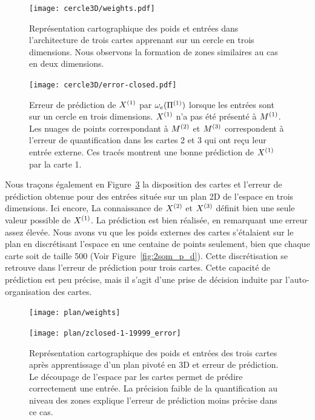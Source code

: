\documentclass[../main]{subfiles}
\begin{document}
\begin{figure}[h!]
	\centering\texttt{[image: cercle3D/weights.pdf]}
	\caption{Représentation cartographique des poids et entrées dans l'architecture de trois cartes apprenant sur un cercle en trois dimensions. Nous observons la formation de zones similaires au cas en deux dimensions. \label{fig:w_cercle}}
\end{figure}

\begin{figure}[h!]
	\texttt{[image: cercle3D/error-closed.pdf]}
	\caption{Erreur de prédiction de $X^{({1})}$ par $\omega_e(\Pi^{({1})})$ lorsque les entrées sont sur un cercle en trois dimensions. $X^{({1})}$ n'a pas été présenté à $M^{({1})}$.
	 Les nuages de points correspondant à $M^{({2})}$ et $M^{({3})}$ correspondent à l'erreur de quantification dans les cartes 2 et 3 qui ont reçu leur entrée externe. Ces tracés montrent une bonne prédiction de $X^{({1})}$ par la carte 1. \label{fig:pred_cercle}}
\end{figure}


Nous traçons également en Figure~\ref{fig:plan3} la disposition des cartes et l'erreur de prédiction obtenue pour des entrées située sur un plan 2D de l'espace en trois dimensions.
Ici encore, La connaissance de $X^{({2})}$ et $X^{({3})}$ définit bien une seule valeur possible de $X^{({1})}$. 
La prédiction est bien réalisée, en remarquant une erreur assez élevée. 
Nous avons vu que les poids externes des cartes s'étalaient sur le plan en discrétisant l'espace en une centaine de points seulement, bien que chaque carte soit de taille 500 (Voir Figure~\ref{fig:2som_p_d}). 
Cette discrétisation se retrouve dans l'erreur de prédiction pour trois cartes.
Cette capacité de prédiction est peu précise, mais il s'agit d'une prise de décision induite par l'auto-organisation des cartes.

\begin{figure}[h!]
	\begin{minipage}{0.48\textwidth}
	\centering\texttt{[image: plan/weights]}
	\end{minipage}
	\begin{minipage}{0.48\textwidth}
	\texttt{[image: plan/zclosed-1-19999\_error]}	
	\end{minipage}	
	\caption{Représentation cartographique des poids et entrées des trois cartes après apprentissage d'un plan pivoté en 3D et erreur de prédiction. 
	Le découpage de l'espace par les cartes permet de prédire correctement une entrée. La précision faible de la quantification au niveau des zones explique l'erreur de prédiction moins précise dans ce cas. \label{fig:plan3}}
	\end{figure}
\end{document}

